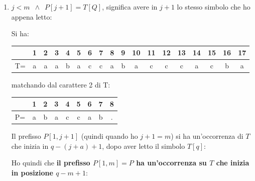 \documentclass[a4paper,12pt, oneside]{book}
\begin{document}
\begin{enumerate}
  \item $j<m\,\,\,\land\,\,\,P[j+1]=T[Q]$, significa avere in $j+1$ lo stesso
  simbolo che ho appena letto:
  \begin{esempio}
    Si ha:
    \begin{table}[H]
      \centering
      \begin{tabular}{c||c|c|c|c|c|c|c|c|c|c|c|c|c|c|c|c|c}
        \hline
        & 1 & 2 & 3 & 4 & 5 & 6 & 7 & 8 & 9 & 10 & 11 & 12 & 13 &14&15&16&17\\
        \hline
        T=&a& a & a& b& a& c &c &a &b &a&c&c&c&a &c &b &a\\
        \hline
      \end{tabular}
    \end{table}
    matchando dal carattere 2 di T:
    \begin{table}[H]
      \centering
      \begin{tabular}{c||c|c|c|c|c|c|c|c}
        \hline
        & 1 & 2 & 3 & 4 & 5 & 6 & 7 &8\\
        \hline
        P=&a& b & a& c& c& a &b &. \\
        \hline
      \end{tabular}
    \end{table}

  \end{esempio}
  Il prefisso $P[1,j+1]$ (quindi quando ho $j+1=m$) si ha un'occorrenza di $T$
  che inizia in $q-(j+a)+1$, dopo aver letto il simbolo $T[q]$:
  \begin{center}
  \end{center}
  Ho quindi che \textbf{il prefisso $P[1,m]=P$ ha un'occorrenza su $T$ che
    inizia in posizione $q-m+1$}:
  \begin{center}
  \end{center}
  

\end{enumerate}
\end{document}
